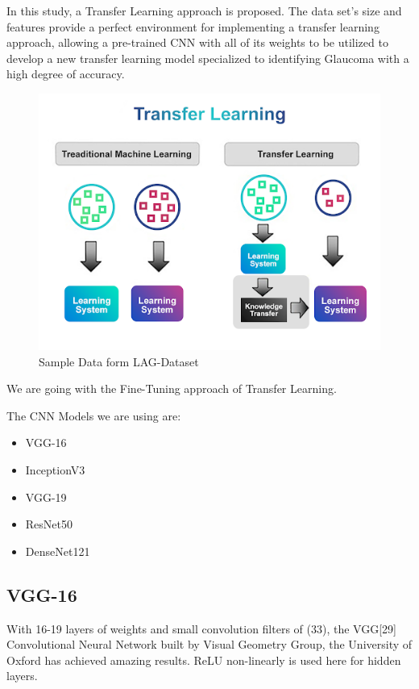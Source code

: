 \vspace{5mm}
\noindent In this study, a Transfer Learning approach is proposed. The data set's size and features provide a perfect environment for implementing a transfer learning approach, allowing a pre-trained CNN with all of its weights to be utilized to develop a new transfer learning model specialized to identifying Glaucoma with a high degree of accuracy.

\vspace{5mm}
\begin{figure}[hbt!]
\centering
\includegraphics[scale=0.75]{images/fig-7.png}
\caption{Sample Data form LAG-Dataset}
\label{fig:x Sample Data form LAG-Dataset}
\end{figure}

\vspace{5mm}
\noindent We are going with the Fine-Tuning approach of Transfer Learning.

\vspace{5mm}
\noindent The CNN Models we are using are:

\begin{itemize}
    \item VGG-16
    \item InceptionV3
    \item VGG-19
    \item ResNet50
    \item DenseNet121
\end{itemize}

\subsection{VGG-16}
With 16-19 layers of weights and small convolution filters of (33), the VGG[29] Convolutional Neural Network built by Visual Geometry Group, the University of Oxford has achieved amazing results. ReLU non-linearly is used here for hidden layers.


